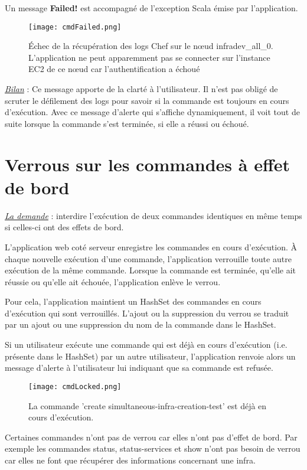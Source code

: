 Un message \textbf{Failed!} est accompagné de l'exception Scala émise par
l'application.

\begin{figure}[H]
  \texttt{[image: cmdFailed.png]}
  \caption{Échec de la récupération des logs Chef sur le nœud infradev\_all\_0.\\
    L'application ne peut apparemment pas se connecter sur l'instance EC2 de
    ce nœud car l'authentification a échoué}
\end{figure}

\underline{\textit{Bilan}} : Ce message apporte de la clarté à l'utilisateur.
Il n'est pas obligé de scruter le défilement des logs pour savoir si la commande
est toujours en cours d'exécution. Avec ce message d'alerte qui s'affiche
dynamiquement, il voit tout de suite lorsque la commande s'est terminée, si elle
a réussi ou échoué.

\section{Verrous sur les commandes à effet de bord}

\underline{\textit{La demande}} : interdire l'exécution de deux commandes identiques en même temps si
celles-ci ont des effets de bord.

L'application web coté serveur enregistre les commandes en cours d'exécution.
À chaque nouvelle exécution d'une commande, l'application verrouille toute autre
exécution de la même commande. Lorsque la commande est terminée, qu'elle ait
réussie ou qu'elle ait échouée, l'application enlève le verrou.

Pour cela, l'application maintient un HashSet des commandes en cours d'exécution
qui sont verrouillés. L'ajout ou la suppression du verrou se traduit par un
ajout ou une suppression du nom de la commande dans le HashSet.

Si un utilisateur exécute une commande qui est déjà en cours d'exécution
(i.e. présente dans le HashSet) par un autre utilisateur, l'application renvoie
alors un message d'alerte à l'utilisateur lui indiquant que sa commande est refusée.

\begin{figure}[H]
  \texttt{[image: cmdLocked.png]}
  \caption{La commande 'create simultaneous-infra-creation-test' est déjà en
    cours d'exécution.}
\end{figure}

Certaines commandes n'ont pas de verrou car elles n'ont pas d'effet de bord.
Par exemple les commandes status, status-services et show n'ont pas besoin
de verrou car elles ne font que récupérer des informations concernant une infra.

